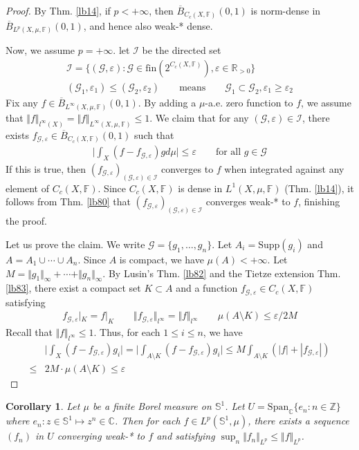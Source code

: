 \documentclass[12pt,b5paper,notitlepage]{article}
\theoremstyle{definition}
\theoremstyle{plain}
\newtheorem{co}[df]{Corollary}
\newcommand{\ovl}{\overline}
\newcommand{\Span}{\mathrm{Span}}
\newcommand{\scr}{\mathscr}
\newcommand{\Cbb}{\mathbb C}
\newcommand{\Zbb}{\mathbb Z}
\newcommand{\Rbb}{\mathbb R}
\newcommand{\Sbb}{{\mathbb S}}
\newcommand{\fin}{\mathrm{fin}}
\newcommand{\Supp}{\mathrm{Supp}}
\newcommand{\Fbb}{\mathbb F}
\newcommand{\eps}{\varepsilon}
\newcommand{\MG}{\mathcal G}
\numberwithin{equation}{section}
\begin{document}
\begin{proof}
By Thm. \ref{lb14}, if $p<+\infty$, then $\ovl B_{C_c(X,\Fbb)}(0,1)$ is norm-dense in $\ovl B_{L^p(X,\mu,\Fbb)}(0,1)$, and hence also weak-* dense.

Now, we assume $p=+\infty$. let $\scr I$ be the directed set
\begin{gather*}
\scr I=\{(\MG,\eps):\MG\in\fin(2^{C_c(X,\Fbb)}),\eps\in\Rbb_{>0}\}\\
(\MG_1,\eps_1)\leq(\MG_2,\eps_2)\qquad\text{means}\qquad \MG_1\subset\MG_2,\eps_1\geq\eps_2
\end{gather*}
Fix any $f\in \ovl B_{L^\infty(X,\mu,\Fbb)}(0,1)$. By adding a $\mu$-a.e. zero function to $f$, we assume that $\Vert f\Vert_{l^\infty(X)}=\Vert f\Vert_{L^\infty(X,\mu,\Fbb)}\leq 1$. We claim that for any $(\MG,\eps)\in\scr I$, there exists $f_{\MG,\eps}\in \ovl B_{C_c(X,\Fbb)}(0,1)$ such that
\begin{align*}
\Big| \int_X (f-f_{\MG,\eps})gd\mu\Big|\leq\eps\qquad\text{for all }g\in\MG
\end{align*}
If this is true, then $(f_{\MG,\eps})_{(\MG,\eps)\in\scr I}$ converges to $f$ when integrated against any element of $C_c(X,\Fbb)$. Since $C_c(X,\Fbb)$ is dense in $L^1(X,\mu,\Fbb)$ (Thm. \ref{lb14}), it follows from Thm. \ref{lb80} that $(f_{\MG,\eps})_{(\MG,\eps)\in\scr I}$ converges weak-* to $f$, finishing the proof.

Let us prove the claim. We write $\MG=\{g_1,\dots,g_n\}$. Let $A_i=\Supp(g_i)$ and $A=A_1\cup\cdots\cup A_n$. Since $A$ is compact, we have $\mu(A)<+\infty$. Let $M=\Vert g_1\Vert_\infty+\cdots+\Vert g_n\Vert_\infty$. By Lusin's Thm. \ref{lb82} and the Tietze extension Thm. \ref{lb83}, there exist a compact set $K\subset A$ and a function $f_{\MG,\eps}\in C_c(X,\Fbb)$ satisfying
\begin{align*}
f_{\MG,\eps}|_K=f|_K\qquad\Vert f_{\MG,\eps}\Vert_{l^\infty}=\Vert f\Vert_{l^\infty}\qquad \mu(A\setminus K)\leq\eps/2M
\end{align*}
Recall that $\Vert f\Vert_{l^\infty}\leq 1$. Thus, for each $1\leq i\leq n$, we have
\begin{align*}
&\Big| \int_X (f-f_{\MG,\eps})g_i\Big|=\Big| \int_{A\setminus K} (f-f_{\MG,\eps})g_i\Big|\leq M\int_{A\setminus K}(|f|+|f_{\MG,\eps}|)\\
\leq&2M\cdot \mu(A\setminus K)\leq \eps
\end{align*}
\end{proof}


\begin{co}
Let $\mu$ be a finite Borel measure on $\Sbb^1$. Let $U=\Span_\Cbb\{e_n:n\in\Zbb\}$ where $e_n:z\in\Sbb^1\mapsto z^n\in\Cbb$. Then for each $f\in L^p(\Sbb^1,\mu)$, there exists a sequence $(f_n)$ in $U$ converging weak-* to $f$ and satisfying $\sup_n\Vert f_n\Vert_{L^p}\leq\Vert f\Vert_{L^p}$.
\end{co}
\end{document}
